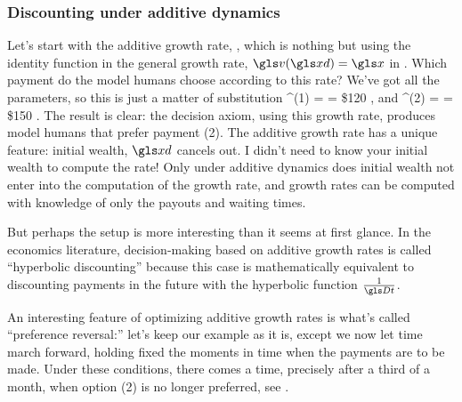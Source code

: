 \subsubsection{Discounting under additive dynamics}

Let's start with the additive growth rate, , which is nothing but using the identity function in the general growth rate, $\gv(\xd)=\x$ in . Which payment do the model humans choose according to this rate? We've got all the parameters, so this is just a matter of substitution
\be
\gad^{(1)} = = \$120 ,
\ee
and
\be
\gad^{(2)} = = \$150 .
\ee
The result is clear: the decision axiom, using this growth rate, produces model humans that prefer payment (2).
The additive growth rate has a unique feature: initial wealth, $\xd$ cancels out. I didn't need to know your initial wealth to compute the rate! Only under additive dynamics does initial wealth not enter into the computation of the growth rate, and growth rates can be computed with knowledge of only the payouts and waiting times.

But perhaps the setup is more interesting than it seems at first glance.
In the economics literature, decision-making based on additive growth rates is called ``hyperbolic discounting'' because this case is mathematically equivalent to discounting payments in the future with the hyperbolic function $\frac{1}{\Dt}$.

An interesting feature of optimizing additive growth rates is what's called ``preference reversal:'' let's keep our example as it is, except we now let time march forward, holding fixed the moments in time when the payments are to be made. Under these conditions, there comes a time, precisely after a third of a month, when option (2) is no longer preferred, see .

